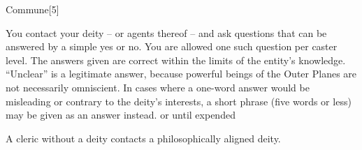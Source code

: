 \begin{spellsection}{Commune}[5]
    \begin{spellheader}
    \end{spellheader}
    \begin{spellcontent}
        \begin{spelltargetinginfo}
        \end{spelltargetinginfo}
        \begin{spelleffects}

            \spellline
            \spelleffect You contact your deity -- or agents thereof -- and ask questions that can be answered by a simple yes or no. You are allowed one such question per caster level. The answers given are correct within the limits of the entity's knowledge. ``Unclear'' is a legitimate answer, because powerful beings of the Outer Planes are not necessarily omniscient. In cases where a one-word answer would be misleading or contrary to the deity's interests, a short phrase (five words or less) may be given as an answer instead.
            \spelldur \durmed or until expended
        \end{spelleffects}
    \end{spellcontent}
    \begin{spellfooter}
        \spellnotes A cleric without a deity contacts a philosophically aligned deity.
    \end{spellfooter}
\end{spellsection}

